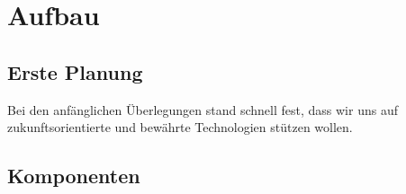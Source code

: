 \chapter{Aufbau}

\section{Erste Planung}
Bei den anfänglichen Überlegungen stand schnell fest, dass wir uns auf zukunftsorientierte und bewährte Technologien stützen wollen.

\section{Komponenten}

